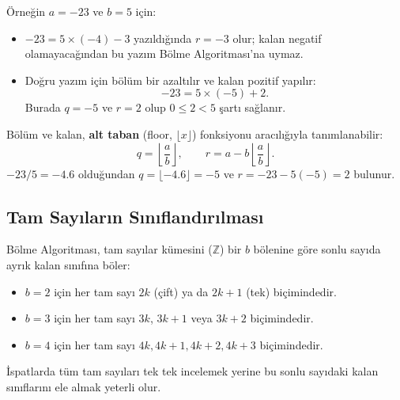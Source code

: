 Örneğin $a = -23$ ve $b = 5$ için:
\begin{itemize}
    \item $-23 = 5 \times (-4) - 3$ yazıldığında $r = -3$ olur; kalan negatif olamayacağından bu yazım Bölme Algoritması'na uymaz.
    \item Doğru yazım için bölüm bir azaltılır ve kalan pozitif yapılır:
    \[
    -23 = 5 \times (-5) + 2.
    \]
    Burada $q = -5$ ve $r = 2$ olup $0 \le 2 < 5$ şartı sağlanır.
\end{itemize}

Bölüm ve kalan, \textbf{alt taban} (floor, $\lfloor x \rfloor$) fonksiyonu aracılığıyla tanımlanabilir:
\[
q = \left\lfloor \frac{a}{b} \right\rfloor, \qquad r = a - b \left\lfloor \frac{a}{b} \right\rfloor.
\]
$-23 / 5 = -4.6$ olduğundan $q = \lfloor -4.6 \rfloor = -5$ ve $r = -23 - 5(-5) = 2$ bulunur.

\begin{figure}[h!]
\centering
{}
\end{figure}

\subsection{Tam Sayıların Sınıflandırılması}
Bölme Algoritması, tam sayılar kümesini ($\mathbb{Z}$) bir $b$ bölenine göre sonlu sayıda ayrık kalan sınıfına böler:
\begin{itemize}
    \item $b = 2$ için her tam sayı $2k$ (çift) ya da $2k+1$ (tek) biçimindedir.
    \item $b = 3$ için her tam sayı $3k$, $3k+1$ veya $3k+2$ biçimindedir.
    \item $b = 4$ için her tam sayı $4k, 4k+1, 4k+2, 4k+3$ biçimindedir.
\end{itemize}
İspatlarda tüm tam sayıları tek tek incelemek yerine bu sonlu sayıdaki kalan sınıflarını ele almak yeterli olur.

